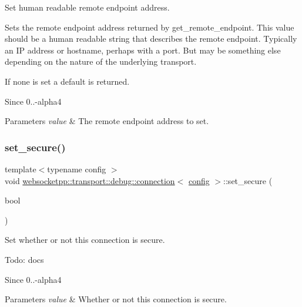 Set human readable remote endpoint address. 

Sets the remote endpoint address returned by {\ttfamily get\+\_\+remote\+\_\+endpoint}. This value should be a human readable string that describes the remote endpoint. Typically an IP address or hostname, perhaps with a port. But may be something else depending on the nature of the underlying transport.

If none is set a default is returned.

\begin{DoxySince}{Since}
0..-\/alpha4
\end{DoxySince}

\begin{DoxyParams}{Parameters}
{\em value} & The remote endpoint address to set. \\
\hline
\end{DoxyParams}
\mbox{\label{classwebsocketpp_1_1transport_1_1debug_1_1connection_a70244283cf80113e73f6dda8c1a2c4be}} 
\subsubsection{\texorpdfstring{set\+\_\+secure()}{set\_secure()}}
{\footnotesize\ttfamily template$<$typename config $>$ \\
void \mbox{\hyperlink{classwebsocketpp_1_1transport_1_1debug_1_1connection}{websocketpp\+::transport\+::debug\+::connection}}$<$ \mbox{\hyperlink{classconfig}{config}} $>$\+::set\+\_\+secure (\begin{DoxyParamCaption}\item[{bool}]{ }\end{DoxyParamCaption})\hspace{0.3cm}{\ttfamily [inline]}}



Set whether or not this connection is secure. 

Todo\+: docs

\begin{DoxySince}{Since}
0..-\/alpha4
\end{DoxySince}

\begin{DoxyParams}{Parameters}
{\em value} & Whether or not this connection is secure. \\
\hline
\end{DoxyParams}
\mbox{\label{classwebsocketpp_1_1transport_1_1debug_1_1connection_a56b96fed344bafbbb0453997dbf54f40}} 
